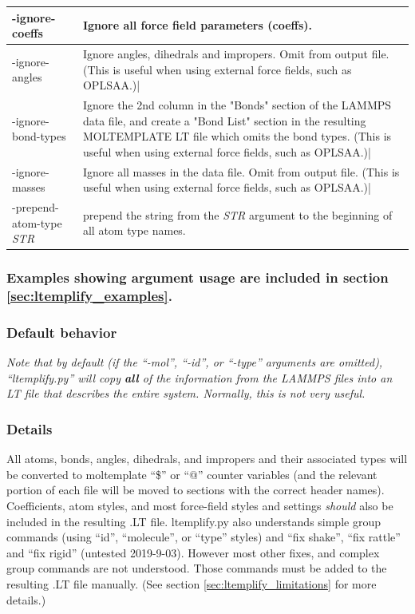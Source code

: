 \documentclass[11pt]{article}
\begin{document}
\begin{tabular}[h]{l|p{10cm}}
-ignore-coeffs
&
Ignore all force field parameters (coeffs).
\\
\hline

-ignore-angles
&
Ignore angles, dihedrals and impropers.  Omit from output file.
(This is useful when using external force fields, such as OPLSAA.)|
\\
\hline

-ignore-bond-types
&
Ignore the 2nd column in the "Bonds" section of the LAMMPS data file,
and create a "Bond List" section in the resulting MOLTEMPLATE LT file
which omits the bond types.
(This is useful when using external force fields, such as OPLSAA.)|
\\
\hline

-ignore-masses
&
Ignore all masses in the data file.  Omit from output file.
(This is useful when using external force fields, such as OPLSAA.)|
\\
\hline

-prepend-atom-type \textit{STR}
&
prepend the string from the \textit{STR} argument to the beginning of
all atom type names.
\\
\hline
\end{tabular}


\subsubsection*{Examples showing argument usage are included
                in section \ref{sec:ltemplify_examples}.}

\pagebreak


\subsubsection*{Default behavior}
\textit{Note that by default
(if the ``-mol'', ``-id'', or ``-type'' arguments are omitted),
``ltemplify.py'' will copy \textbf{all} of the information
from the LAMMPS files into an LT file that describes the entire system.
Normally, this is not very useful.}



\subsubsection*{Details}

All atoms, bonds, angles, dihedrals, and impropers and their associated
types will be converted to moltemplate ``\$'' or ``@'' counter variables
(and the relevant portion of each file will be moved to sections
with the correct header names).
Coefficients, atom styles, and most force-field styles and
settings \textit{should} also be included in the resulting .LT file.
ltemplify.py also understands simple group commands
(using ``id'', ``molecule'', or ``type'' styles)
and ``fix shake'', ``fix rattle'' and ``fix rigid''  (untested 2019-9-03).
However most other fixes, and complex group commands are not understood.
Those commands must be added to the resulting .LT file manually.
(See section \ref{sec:ltemplify_limitations} for more details.)
\end{document}
